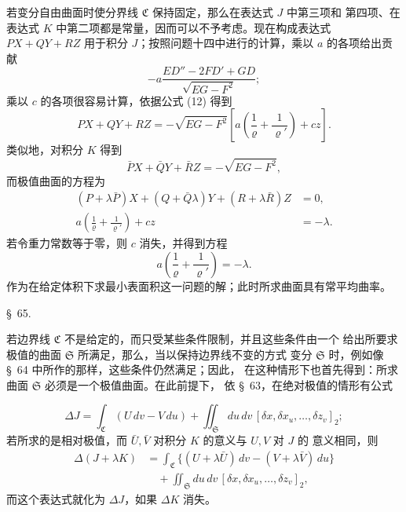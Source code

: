 \documentclass[11pt,a4paper,leqno]{article}
\begin{document}
若变分自由曲面时使分界线 $\mathfrak{C}$ 保持固定，那么在表达式 $J$ 中第三项和
第四项、在表达式 $K$ 中第二项都是常量，因而可以不予考虑。现在构成表达式
$PX+QY+RZ$ 用于积分 $J$；按照问题十四中进行的计算，乘以 $a$ 的各项给出贡献
\[
-a\frac{ED''-2FD'+GD}{\sqrt{EG-F^2}};
\]
乘以 $c$ 的各项很容易计算，依据公式 (12) 得到
\[
PX+QY+RZ=-\sqrt{EG-F^2}
\left[a\left(\frac{1}{\varrho}+\frac{1}{\varrho'}\right)+cz\right].
\]
类似地，对积分 $K$ 得到
\[
\bar PX+\bar QY+\bar RZ=-\sqrt{EG-F^2},
\]
而极值曲面的方程为
\[
\begin{aligned}
(P+\lambda\bar P)X+(Q+\bar Q\lambda)Y+(R+\lambda\bar R)Z&=0,\\
a\left(\frac{1}{\varrho}+\frac{1}{\varrho'}\right)+cz&=-\lambda.
\end{aligned}
\]
若令重力常数等于零，则 $c$ 消失，并得到方程
\[
a\left(\frac{1}{\varrho}+\frac{1}{\varrho'}\right)=-\lambda.
\]
作为在给定体积下求最小表面积这一问题的解；此时所求曲面具有常平均曲率。

\begin{center}
{\large \S~65.}
\end{center}

若边界线 $\mathfrak{C}$ 不是给定的，而只受某些条件限制，并且这些条件由一个
给出所要求极值的曲面 $\mathfrak{S}$ 所满足，那么，当以保持边界线不变的方式
变分 $\mathfrak{S}$ 时，例如像 \S~64 中所作的那样，这些条件仍然满足；因此，
在这种情形下也首先得到：所求曲面 $\mathfrak{S}$ 必须是一个极值曲面。在此前提下，
依 \S~63，在绝对极值的情形有公式

\[
\Delta J=\int_{\mathfrak{C}}(U\,dv-V\,du)
+\iint_{\mathfrak{S}}du\,dv\,
[\delta x,\delta x_u,\ldots,\delta z_v]_2;
\]
若所求的是相对极值，而 $\bar U,\bar V$ 对积分 $K$ 的意义与 $U,V$ 对 $J$ 的
意义相同，则
\begin{equation}\tag{13}
\begin{aligned}
\Delta(J+\lambda K)
&=\int_{\mathfrak{C}}
\{(U+\lambda\bar U)\,dv-(V+\lambda\bar V)\,du\}\\
&\quad+\iint_{\mathfrak{S}}du\,dv\,
[\delta x,\delta x_u,\ldots,\delta z_v]_2,
\end{aligned}
\end{equation}
而这个表达式就化为 $\Delta J$，如果 $\Delta K$ 消失。
\end{document}
